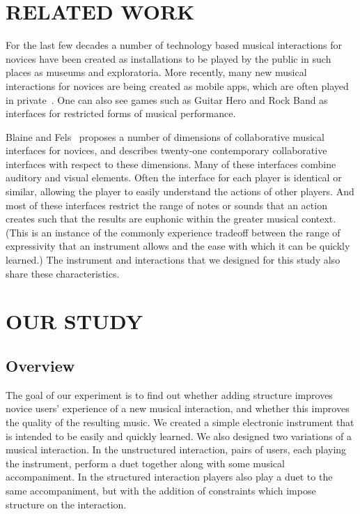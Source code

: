 \documentclass{article}
\begin{document}
\section{RELATED WORK}

For the last few decades a number of technology based musical interactions for novices have
been created as installations to be played by the public in such places as museums and exploratoria.  More recently, many new musical interactions for novices are being created as mobile apps, which are often played in private~\cite{smule,smule-2}.  One can also see games such as Guitar Hero and Rock Band as interfaces for restricted forms of musical performance.

Blaine and Fels~\cite{survey} proposes a number of dimensions of collaborative musical interfaces for novices, and describes twenty-one contemporary collaborative interfaces with respect to these dimensions.  Many of these interfaces combine auditory and visual elements.  Often the interface for each player is identical or similar, allowing the player to easily understand the actions of other players. And most of these interfaces restrict the range of notes or sounds that an action creates such that the results are euphonic within the greater musical context.  (This is an instance of the commonly experience tradeoff between the range of expressivity that an instrument allows and the ease with which it can be quickly learned.)  The instrument and interactions that we designed for this study also share these characteristics.





\section{OUR STUDY}

\subsection{Overview}

The goal of our experiment is to find out whether adding structure improves novice users’ experience of a new musical interaction, and whether this improves the quality of the resulting music.  We created a simple electronic instrument that is intended to be easily and quickly learned.  We also designed two variations of a musical interaction.  In the unstructured interaction, pairs of users, each playing the instrument, perform a duet together along with some musical accompaniment.  In the structured interaction players also play a duet to the same accompaniment, but with the addition of constraints which impose structure on the interaction.
\end{document}
